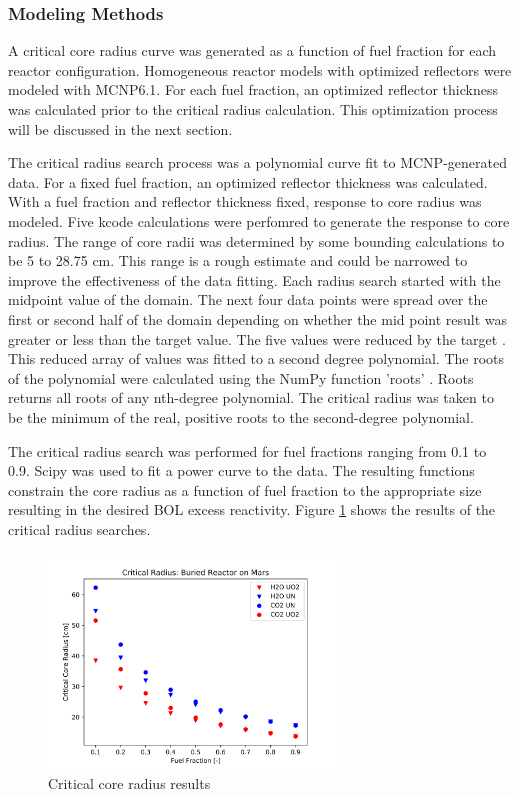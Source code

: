 \subsubsection{Modeling Methods}
A critical core radius curve was generated as a function of fuel fraction for
each reactor configuration. Homogeneous reactor models with optimized reflectors
were modeled with MCNP6.1. For each fuel fraction, an optimized reflector
thickness was calculated prior to the critical radius calculation. This
optimization process will be discussed in the next section.

The critical radius search process was a polynomial curve fit to MCNP-generated
\keff data. For a fixed fuel fraction, an optimized reflector thickness was
calculated. With a fuel fraction and reflector thickness fixed, \keff response
to core radius was modeled. Five kcode calculations were perfomred to generate
the \keff response to core radius. The range of core radii was determined by some
bounding calculations to be 5 to 28.75 cm. This range is a rough estimate and
could be narrowed to improve the effectiveness of the data fitting. Each radius
search started with the midpoint value of the domain. The next four data points
were spread over the first or second half of the domain depending on whether the
mid point result was greater or less than the target \keff value. The five \keff
values were reduced by the target \keff. This reduced array of values was fitted
to a second degree polynomial. The roots of the polynomial were calculated using
the NumPy function 'roots' \citep{numpy}. Roots returns all roots of any
nth-degree polynomial. The critical radius was taken to be the minimum of the
real, positive roots to the second-degree polynomial.

The critical radius search was performed for fuel fractions ranging from 0.1 to
0.9. Scipy was used to fit a power curve to the data. The resulting functions
constrain the core radius as a function of fuel fraction to the appropriate size
resulting in the desired BOL excess reactivity. Figure
\ref{fig:crit_core_radius} shows the results of the critical radius searches.

\begin{figure}[h]
    \centering
    \includegraphics[width=3in]{../images/crit_radius.png}
\caption{Critical core radius results}
\label{fig:crit_core_radius}
\end{figure}

